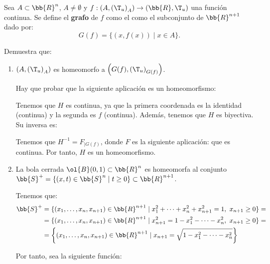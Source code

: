 \begin{ejercicio}
    Sea $A \subset \bb{R}^n$, $A\neq \emptyset$ y $f:(A,{(\T_u)}_A) \to (\bb{R}, \T_u)$ una función continua. Se define el \textbf{grafo} de $f$ como el como el subconjunto de $\bb{R}^{n+1}$ dado por:
    \begin{equation*}
        G(f) = \{(x, f(x)) \mid x \in A\} .
    \end{equation*}

    Demuestra que:
    \begin{enumerate}
        \item  $\left({A,(\T_u)}_A\right)$ es homeomorfo a $\left(G(f),{(\T_u)}_{G(f)}\right)$.

        Hay que probar que la siguiente aplicación es un homeomorfismo:

        Tenemos que $H$ es continua, ya que la primera coordenada es la identidad (continua) y la segunda es $f$ (continua). Además, tenemos que $H$ es biyectiva. Su inversa es:

        Tenemos que $H^{-1}=F_{\big| G(f)}$, donde $F$ es la siguiente aplicación:
        que es continua. Por tanto, $H$ es un homeomorfismo.
        
        \item La bola cerrada $\ol{B}(0, 1) \subset \bb{R}^n$ es homeomorfa al conjunto $\bb{S}^+ = \{(x, t) \in \bb{S}^n \mid t \geq 0\} \subset\bb{R}^{n+1}$.

        Tenemos que:
        \begin{equation*}
            \begin{split}
                \bb{S}^+ &= \{(x_1,\dots,x_n,x_{n+1})\in \bb{R}^{n+1}\mid x_1^2+\dots+x_n^2+x_{n+1}^2=1,~ x_{n+1}\geq 0\} =\\
                &= \{(x_1,\dots,x_n,x_{n+1})\in \bb{R}^{n+1}\mid x_{n+1}^2=1-x_1^2-\dots-x_n^2,~ x_{n+1}\geq 0\} =\\
                &= \left\{(x_1,\dots,x_n,x_{n+1})\in \bb{R}^{n+1}\mid x_{n+1}=\sqrt{1-x_1^2-\dots-x_n^2}\right\}
            \end{split}
        \end{equation*}

        Por tanto, sea la siguiente función:
        

\end{enumerate}
\end{ejercicio}
